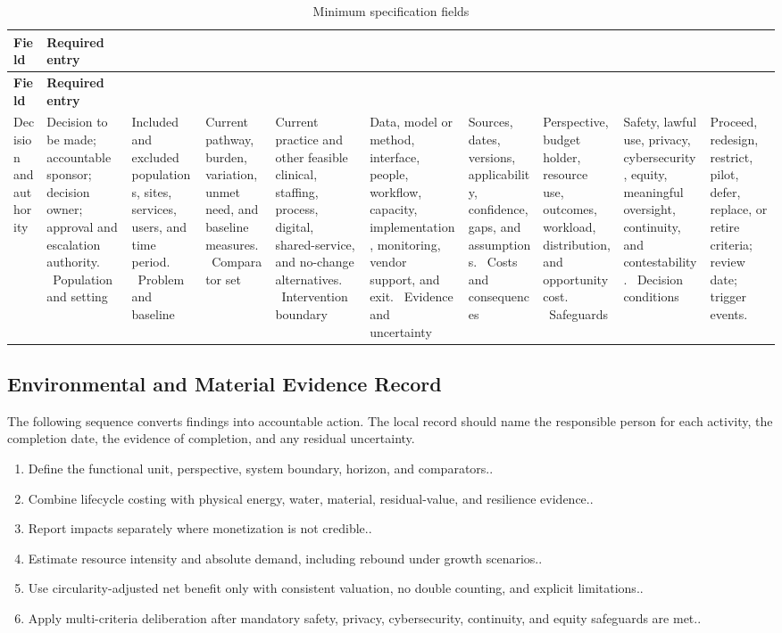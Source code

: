 \begin{longtable}{@{}p{}p{}@{}}
\caption{Minimum specification fields}
\label{tab:comp-ch15-spec-fields}\\
\toprule
\textbf{Field} & \textbf{Required entry} \\
\midrule
\endfirsthead
\toprule
\textbf{Field} & \textbf{Required entry} \\
\midrule
\endhead
\bottomrule
\endlastfoot
Decision and authority & Decision to be made; accountable sponsor; decision owner; approval and escalation authority. \
Population and setting & Included and excluded populations, sites, services, users, and time period. \
Problem and baseline & Current pathway, burden, variation, unmet need, and baseline measures. \
Comparator set & Current practice and other feasible clinical, staffing, process, digital, shared-service, and no-change alternatives. \
Intervention boundary & Data, model or method, interface, people, workflow, capacity, implementation, monitoring, vendor support, and exit. \
Evidence and uncertainty & Sources, dates, versions, applicability, confidence, gaps, and assumptions. \
Costs and consequences & Perspective, budget holder, resource use, outcomes, workload, distribution, and opportunity cost. \
Safeguards & Safety, lawful use, privacy, cybersecurity, equity, meaningful oversight, continuity, and contestability. \
Decision conditions & Proceed, redesign, restrict, pilot, defer, replace, or retire criteria; review date; trigger events. \
\end{longtable}

\subsection{Environmental and Material Evidence Record}
\label{sec:comp-ch15-supp-2}
The following sequence converts findings into accountable action. The local record
should name the responsible person for each activity, the completion date, the
evidence of completion, and any residual uncertainty.

\begin{enumerate}
 \item Define the functional unit, perspective, system boundary, horizon, and comparators..
 \item Combine lifecycle costing with physical energy, water, material, residual-value, and resilience evidence..
 \item Report impacts separately where monetization is not credible..
 \item Estimate resource intensity and absolute demand, including rebound under growth scenarios..
 \item Use circularity-adjusted net benefit only with consistent valuation, no double counting, and explicit limitations..
 \item Apply multi-criteria deliberation after mandatory safety, privacy, cybersecurity, continuity, and equity safeguards are met..
\end{enumerate}

